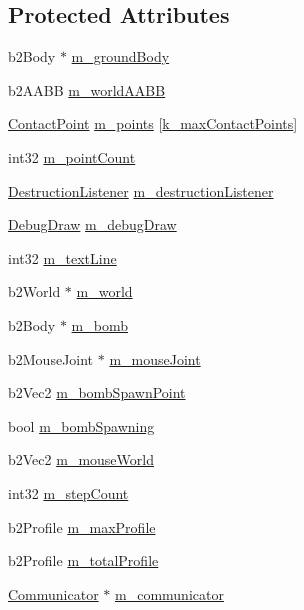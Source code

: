 \subsection*{Protected Attributes}
\begin{DoxyCompactItemize}
\item 
b2\-Body $\ast$ \hyperlink{classSimulatorPage_ab4c6f15c6a33d3884c3e3a55b93971ec}{m\-\_\-ground\-Body}
\item 
b2\-A\-A\-B\-B \hyperlink{classSimulatorPage_afe7bd14c770a28ab335a803ebc93d1a5}{m\-\_\-world\-A\-A\-B\-B}
\item 
\hyperlink{structContactPoint}{Contact\-Point} \hyperlink{classSimulatorPage_afa967705601096830dc2bb2a0fd3b999}{m\-\_\-points} \mbox{[}\hyperlink{SimulatorPage_8h_ae34d209729703751560149e5bcb5d2f0}{k\-\_\-max\-Contact\-Points}\mbox{]}
\item 
int32 \hyperlink{classSimulatorPage_a26946c6050b34954b256c4b0271be534}{m\-\_\-point\-Count}
\item 
\hyperlink{classDestructionListener}{Destruction\-Listener} \hyperlink{classSimulatorPage_a3fd7bc3de5a63d35d152f8446f41cd53}{m\-\_\-destruction\-Listener}
\item 
\hyperlink{classDebugDraw}{Debug\-Draw} \hyperlink{classSimulatorPage_a9b074b47b00e81c08154cf2975282a6d}{m\-\_\-debug\-Draw}
\item 
int32 \hyperlink{classSimulatorPage_aebe43734cac8bf5c8a88fb20e0975b63}{m\-\_\-text\-Line}
\item 
b2\-World $\ast$ \hyperlink{classSimulatorPage_af1b8c6fc0d7ede12a5132fe44c0fae5e}{m\-\_\-world}
\item 
b2\-Body $\ast$ \hyperlink{classSimulatorPage_a9ecb370ad58655cbc55190869fe43fab}{m\-\_\-bomb}
\item 
b2\-Mouse\-Joint $\ast$ \hyperlink{classSimulatorPage_a1dd1eef1ae65277d3bd5e93c44baca03}{m\-\_\-mouse\-Joint}
\item 
b2\-Vec2 \hyperlink{classSimulatorPage_a1be96eadc8befadc61960d68e602238a}{m\-\_\-bomb\-Spawn\-Point}
\item 
bool \hyperlink{classSimulatorPage_a5140893531a64b6fdf035b0c1ab448eb}{m\-\_\-bomb\-Spawning}
\item 
b2\-Vec2 \hyperlink{classSimulatorPage_aba988f418bc061a8d70982589916f662}{m\-\_\-mouse\-World}
\item 
int32 \hyperlink{classSimulatorPage_ac9a5a37acf3ec09e34983fe661ec5d3c}{m\-\_\-step\-Count}
\item 
b2\-Profile \hyperlink{classSimulatorPage_a715c353347e2e677ac7e4dadfe3b0792}{m\-\_\-max\-Profile}
\item 
b2\-Profile \hyperlink{classSimulatorPage_a53d76f9f1cd19e16205223d0277a878d}{m\-\_\-total\-Profile}
\item 
\hyperlink{classCommunicator}{Communicator} $\ast$ \hyperlink{classSimulatorPage_a26c6d51e11a440700f8400da277926b1}{m\-\_\-communicator}
\end{DoxyCompactItemize}
